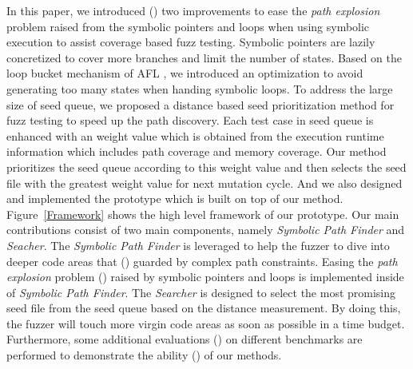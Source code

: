 In this paper, we introduced ({\color{red}{propose two advanced techniques}}) 
 two improvements to ease the \textit{path explosion} problem 
 raised from the symbolic pointers and loops when using symbolic execution to assist coverage based fuzz testing. 
 Symbolic pointers are lazily concretized to cover more branches and limit the number of states. 
 Based on the loop bucket mechanism of AFL \cite{}, 
 we introduced an optimization to avoid generating too many states when handing symbolic loops. 
 To address the large size of seed queue, 
 we proposed a distance based seed prioritization method for fuzz testing to speed up the path discovery. 
 Each test case in seed queue is enhanced with an weight value 
 which is obtained from the execution runtime information which includes path coverage and memory coverage.
 Our method prioritizes the seed queue according to this weight value and 
 then selects the seed file with the greatest weight value for next mutation cycle.
 And we also designed and implemented the prototype which is built on top of our method. 
 Figure~\ref{Framework} shows the high level framework of our prototype.
 Our main contributions consist of two main components, namely \emph{Symbolic Path Finder} and \emph{Seacher}. 
 The \emph{Symbolic Path Finder} is leveraged to help the fuzzer to dive into deeper code areas 
 that ({\color{red}{are}}) guarded by complex path constraints. 
 Easing the \textit{path explosion} problem ({\color{red}{Technique to handle the path explosion problme}}) 
 raised by symbolic pointers and loops 
 is implemented inside of \emph{Symbolic Path Finder}. 
 The \emph{Searcher} is designed to select the most promising seed file 
 from the seed queue based on the distance measurement. 
 By doing this, the fuzzer will touch more virgin code areas as soon as possible in a time budget. 
 Furthermore, some additional evaluations ({\color{red}{do not say additional.}}) 
 on different benchmarks are performed to demonstrate the ability ({\color{red}{capability}}) of our methods.

